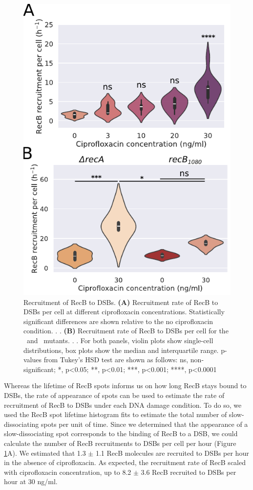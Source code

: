\begin{figure}[htbp]
    \centering
    \includegraphics[width=.35\textwidth]{Figures/Fig3_RecB_recruitment.pdf}
    \caption{Recruitment of RecB to DSBs. \textbf{(A)} Recruitment rate of RecB to DSBs per cell at different ciprofloxacin concentrations. Statistically significant differences are shown relative to the no ciprofloxacin condition. . . \textbf{(B)} Recruitment rate of RecB to DSBs per cell for the \dreca\ and \geneteneighty\ mutants. . . For both panels, violin plots show single-cell distributions, box plots show the median and interquartile range. p-values from Tukey's HSD test are shown as follows: ns, non-significant; *, p<0.05; **, p<0.01; ***, p<0.001; ****, p<0.0001}
    \label{Fig:recruitment}
\end{figure}

Whereas the lifetime of RecB spots informs us on how long RecB stays bound to DSBs, the rate of appearance of spots can be used to estimate the rate of recruitment of RecB to DSBs under each DNA damage condition. To do so, we used the RecB spot lifetime histogram fits to estimate the total number of slow-dissociating spots per unit of time. Since we determined that the appearance of a slow-dissociating spot corresponds to the binding of RecB to a DSB, we could calculate the number of RecB recruitments to DSBs per cell per hour (Figure \ref{Fig:recruitment}A). We estimated that 1.3 $\pm$ 1.1 RecB molecules are recruited to DSBs per hour in the absence of ciprofloxacin. As expected, the recruitment rate of RecB scaled with ciprofloxacin concentration, up to 8.2 $\pm$ 3.6 RecB recruited to DSBs per hour at 30 ng/ml.

